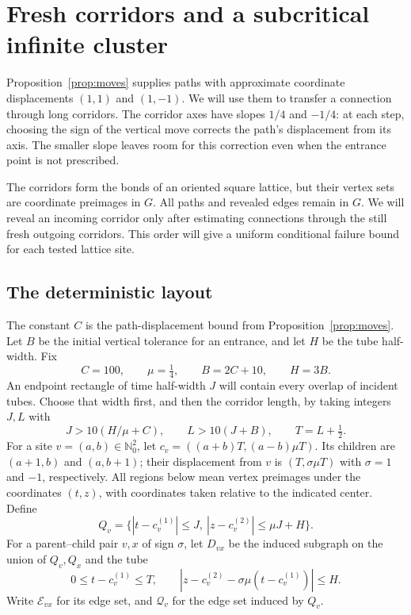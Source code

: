 \documentclass[11pt]{article}
\theoremstyle{definition}
\begin{document}
\section{Fresh corridors and a subcritical infinite cluster}
\label{sec:corridor-exploration}

Proposition~\ref{prop:moves} supplies paths with approximate coordinate
displacements $(1,1)$ and $(1,-1)$. We will use them to transfer a
connection through long corridors. The corridor axes have slopes $1/4$ and $-1/4$:
at each step, choosing the sign of the vertical move corrects the
path's displacement from its axis. The smaller slope leaves room for
this correction even when the entrance point is not prescribed.

The corridors form the bonds of an oriented square lattice, but their
vertex sets are coordinate preimages in $G$. All paths and revealed
edges remain in $G$. We will reveal an incoming corridor only after
estimating connections through the still fresh outgoing corridors.
This order will give a uniform conditional failure bound for each
tested lattice site.

\subsection{The deterministic layout}

The constant $C$ is the path-displacement bound from
Proposition~\ref{prop:moves}. Let $B$ be the initial vertical tolerance
for an entrance, and let $H$ be the tube half-width. Fix
\[
 C=100,\qquad \mu=\tfrac14,\qquad B=2C+10,\qquad H=3B.
\]
An endpoint rectangle of time half-width $J$ will contain every overlap
of incident tubes. Choose that width first, and then the corridor
length, by taking integers $J,L$ with
\[
 J>10(H/\mu+C),\qquad L>10(J+B),\qquad T=L+\tfrac12.
\]
For a site $v=(a,b)\in\mathbb N_0^2$, let
$c_v=((a+b)T,(a-b)\mu T)$. Its children are $(a+1,b)$ and
$(a,b+1)$; their displacement from $v$ is $(T,\sigma\mu T)$ with
$\sigma=1$ and $-1$, respectively. All regions below mean vertex
preimages under the coordinates $(t,z)$, with coordinates taken
relative to the indicated center. Define
\[
 Q_v=\{|t-c_v^{(1)}|\le J,\
          |z-c_v^{(2)}|\le\mu J+H\}.
\]
For a parent--child pair $v,x$ of sign $\sigma$, let $D_{vx}$ be the
induced subgraph on the union of $Q_v,Q_x$ and the tube
\[
 0\le t-c_v^{(1)}\le T,\qquad
 |z-c_v^{(2)}-\sigma\mu(t-c_v^{(1)})|\le H.
\]
Write $\mathcal E_{vx}$ for its edge set, and $\mathcal Q_v$ for
the edge set induced by $Q_v$.
\end{document}
